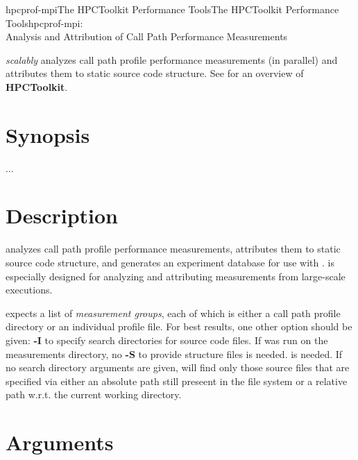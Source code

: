 \documentclass[english]{article}
\begin{document}
\begin{Name}{1}{hpcprof-mpi}{The HPCToolkit Performance Tools}{The HPCToolkit Performance Tools}{hpcprof-mpi:\\ Analysis and Attribution of Call Path Performance Measurements}

 \emph{scalably} analyzes call path profile performance measurements (in parallel) and attributes them to static source code structure.
See  for an overview of \textbf{HPCToolkit}.

\end{Name}

\section{Synopsis}

  ...

\section{Description}

 analyzes call path profile performance measurements,
attributes them to static source code structure,
and generates an experiment database for use with .
 is especially designed for analyzing and attributing measurements
from large-scale executions.

 expects a list of \emph{measurement groups},
each of which is either a call path profile directory or an individual profile file.
For best results, one other option should be given:
\textbf{-I} to specify search directories for source code files.
If {} was run on the measurements directory, no \textbf{-S} to provide structure files is needed.
is needed.
If no search directory arguments are given,
 will find only those source files that are specified via
either an absolute path still preseent in the file system
or a relative path w.r.t. the current working directory.


\section{Arguments}
\end{document}
